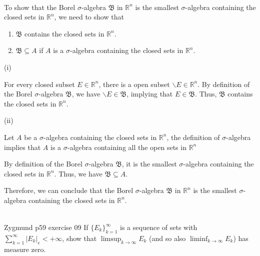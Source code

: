 \documentclass[UTF8,a4paper,10pt]{article}
\begin{document}
  \begin{solution}\,

    To show that the Borel \(\sigma\)-algebra \(\mathfrak{B}\)  in \(\mathbb{R}^n\)  is the smallest \(\sigma\)-algebra containing the closed sets in \(\mathbb{R}^n\), we need to show that 

    \begin{enumerate}[label=(\roman*)]
      \item \(\mathfrak{B}\) contains the closed sets in \(\mathbb{R}^n\).
      \item \(\mathfrak{B} \subseteq A\) if \(A\) is a \(\sigma\)-algebra containing the closed sets in \(\mathbb{R}^n\).
    \end{enumerate}

(i)

For every closed subset \(E \in\mathbb{R}^n\), there is a open subset \(\backslash E \in \mathbb{R}^n\). By definition of the Borel \(\sigma\)-algebra \(\mathfrak{B}\), we have \(\backslash E \in \mathfrak{B}\), implying that \(E\in \mathfrak{B}\). Thus, \(\mathfrak{B}\) contains the closed sets in \(\mathbb{R}^n\).

(ii)

Let \(A\) be a \(\sigma\)-algebra containing the closed sets in \(\mathbb{R}^n\), the definition of \(\sigma\)-algebra implies that \(A\) is a \(\sigma\)-algebra containing all the open sets in \(\mathbb{R}^n\)

By definition of the Borel \(\sigma\)-algebra \(\mathfrak{B}\), it is the smallest \(\sigma\)-algebra containing the closed sets in \(\mathbb{R}^n\). Thus, we have \(\mathfrak{B} \subseteq A\).

Therefore, we can conclude that the Borel \(\sigma\)-algebra \(\mathfrak{B}\)  in \(\mathbb{R}^n\)  is the smallest \(\sigma\)-algebra containing the closed sets in \(\mathbb{R}^n\).



\begin{equation*}
  \begin{aligned}
  \end{aligned}
\end{equation*}


  \end{solution}

  
  \begin{Problem}[]{Zygmund p59 exercise 09}
    If \(\{E_k\}_{k=1}^{\infty}\) is a sequence of sets with \(\sum_{k=1}^{\infty}|E_k|_e<+\infty\), show that \(\limsup_{k\to\infty}E_k\)
    (and so also \(\liminf_{k\to\infty}E_k\)) has measure zero.
  \end{Problem}
\end{document}
